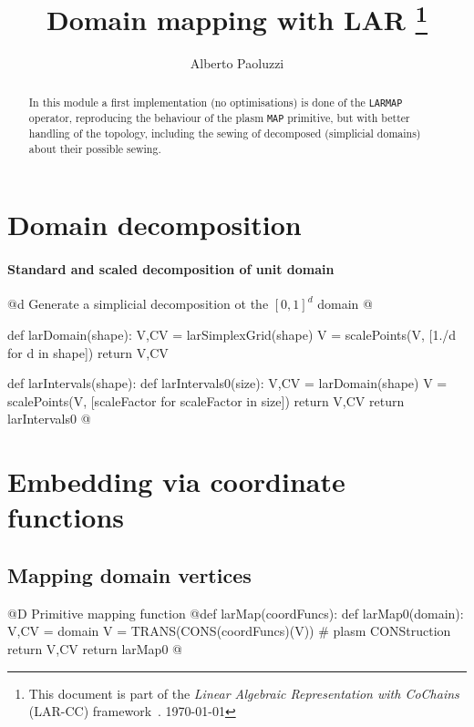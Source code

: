 \documentclass[11pt,oneside]{article}	%
\title{Domain mapping with LAR
\footnote{This document is part of the \emph{Linear Algebraic Representation with CoChains} (LAR-CC) framework~\cite{cclar-proj:2013:00}. \today}
}
\author{Alberto Paoluzzi}
\begin{document}
\maketitle
\nonstopmode

\begin{abstract}
In this module a first implementation (no optimisations) is done of the \texttt{LARMAP} operator, reproducing the behaviour of the plasm \texttt{MAP} primitive, but with better handling of the topology, including the sewing of decomposed (simplicial domains) about their possible sewing.
\end{abstract}

\tableofcontents

\section{Domain decomposition}

\paragraph{Standard and scaled decomposition of unit domain}

@d Generate a simplicial decomposition ot the $[0,1]^d$ domain
@{def larDomain(shape):
	V,CV = larSimplexGrid(shape)
	V = scalePoints(V, [1./d for d in shape])
	return V,CV

def larIntervals(shape):
	def larIntervals0(size):
		V,CV = larDomain(shape)
		V = scalePoints(V, [scaleFactor for scaleFactor in size])
		return V,CV
	return larIntervals0
@}

\section{Embedding via coordinate functions}

\subsection{Mapping domain vertices}
@D Primitive mapping function 
@{def larMap(coordFuncs):
	def larMap0(domain):
		V,CV = domain
		V = TRANS(CONS(coordFuncs)(V))  # plasm CONStruction
		return V,CV
	return larMap0
@}
\end{document}
